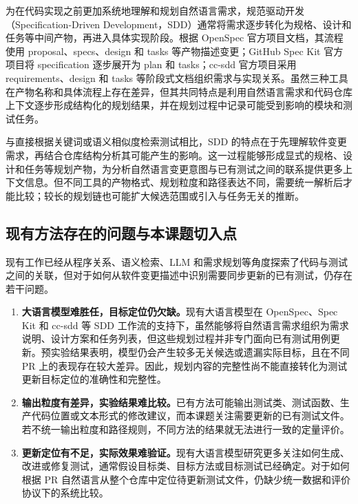 为在代码实现之前更加系统地理解和规划自然语言需求，规范驱动开发（Specification-Driven Development，SDD）通常将需求逐步转化为规格、设计和任务等中间产物，再进入具体实现阶段。根据 OpenSpec 官方项目文档\cite{openspecOfficial}，其流程使用 proposal、specs、design 和 tasks 等产物描述变更；GitHub Spec Kit 官方项目\cite{speckitOfficial}将 specification 逐步展开为 plan 和 tasks；cc-sdd 官方项目\cite{ccsddOfficial}采用 requirements、design 和 tasks 等阶段式文档组织需求与实现关系。虽然三种工具在产物名称和具体流程上存在差异，但其共同特点是利用自然语言需求和代码仓库上下文逐步形成结构化的规划结果，并在规划过程中记录可能受到影响的模块和测试任务。

与直接根据关键词或语义相似度检索测试相比，SDD 的特点在于先理解软件变更需求，再结合仓库结构分析其可能产生的影响。这一过程能够形成显式的规格、设计和任务等规划产物，为分析自然语言变更意图与已有测试之间的联系提供更多上下文信息。但不同工具的产物格式、规划粒度和路径表达不同，需要统一解析后才能比较；较长的规划链也可能扩大候选范围或引入与任务无关的推断。

\subsection{现有方法存在的问题与本课题切入点}

现有工作已经从程序关系、语义检索、LLM 和需求规划等角度探索了代码与测试之间的关联，但对于如何从软件变更描述中识别需要同步更新的已有测试，仍存在若干问题。

\begin{enumerate}
  \item \textbf{大语言模型难胜任，目标定位仍欠缺。}现有大语言模型在 OpenSpec、Spec Kit 和 cc-sdd 等 SDD 工作流的支持下，虽然能够将自然语言需求组织为需求说明、设计方案和任务列表，但这些规划过程并非专门面向已有测试用例更新。预实验结果表明，模型仍会产生较多无关候选或遗漏实际目标，且在不同 PR 上的表现存在较大差异。因此，规划内容的完整性尚不能直接转化为测试更新目标定位的准确性和完整性。

  \item \textbf{输出粒度有差异，实验结果难比较。}已有方法可能输出测试类、测试函数、生产代码位置或文本形式的修改建议，而本课题关注需要更新的已有测试文件。若不统一输出粒度和路径规则，不同方法的结果就无法进行一致的定量评价。

  \item \textbf{更新定位有不足，实际效果难验证。}现有大语言模型研究更多关注如何生成、改进或修复测试，通常假设目标类、目标方法或目标测试已经确定。对于如何根据 PR 自然语言从整个仓库中定位待更新测试文件，仍缺少统一数据和评价协议下的系统比较。
\end{enumerate}

